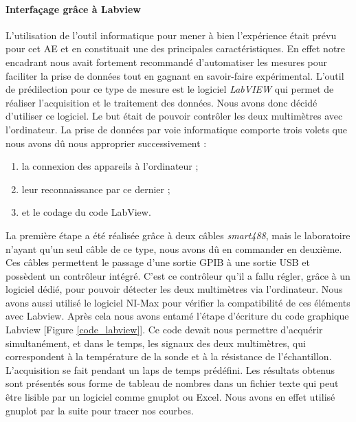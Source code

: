 \paragraph{Interfaçage grâce à Labview}
L'utilisation de l'outil informatique pour mener à bien l'expérience était prévu pour cet AE 
et en constituait une des principales caractéristiques. En effet notre encadrant nous avait fortement recommandé 
d'automatiser les mesures pour faciliter la prise de données tout en gagnant en savoir-faire expérimental. L'outil de 
prédilection pour ce type de mesure est le logiciel \emph{LabVIEW} qui permet de réaliser l'acquisition et le traitement des données. 
Nous avons donc décidé d'utiliser ce logiciel. Le but était de pouvoir contrôler les deux multimètres avec l'ordinateur. 
La prise de données par voie informatique comporte trois volets que nous avons dû nous approprier successivement : 

\begin{enumerate}
\item la connexion des appareils à l'ordinateur ; 
\item leur reconnaissance par ce dernier ; 
\item et le codage du code LabView. 
\end{enumerate}

La première étape a été réalisée grâce à deux câbles \emph{smart488}, mais le laboratoire n'ayant qu'un seul câble de ce type, nous avons dû en commander en deuxième.
Ces câbles permettent le passage d'une sortie GPIB à une sortie USB et possèdent un contrôleur intégré. 
C'est ce contrôleur qu'il a fallu régler, grâce à un logiciel dédié, pour pouvoir détecter les deux multimètres 
via l'ordinateur. Nous avons aussi utilisé le logiciel NI-Max pour vérifier la compatibilité de ces éléments avec Labview. 
Après cela nous avons entamé l'étape d'écriture du code graphique Labview [Figure \ref{code_labview}]. Ce code devait nous permettre d'acquérir 
simultanément, et dans le temps, les signaux des deux multimètres, qui correspondent à la température de la sonde 
et à la résistance de l'échantillon. L'acquisition se fait pendant un laps de temps prédéfini. Les résultats obtenus sont présentés sous forme de tableau de nombres dans un fichier texte qui peut être lisible par un logiciel comme gnuplot ou Excel.
Nous avons en effet utilisé gnuplot par la suite pour tracer nos courbes.

